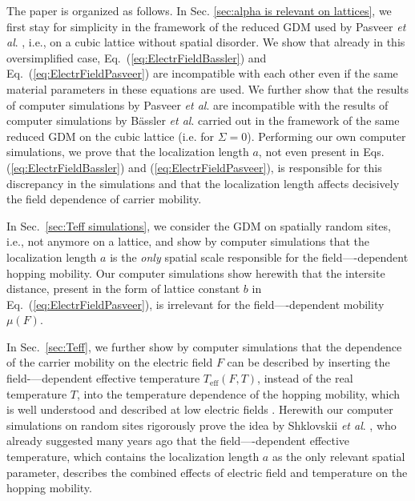 \documentclass[aps,reprint,amsmath,amssymb,superscriptaddress,showpacs,prb]{revtex4-1}
\begin{document}
The paper is organized as follows. In Sec. \ref{sec:alpha is relevant on lattices}, we first stay for simplicity in the framework of the reduced GDM used by Pasveer \textit{et al}. \cite{Pasveer2005}, i.e., on a cubic lattice without spatial disorder. We show that already in this oversimplified case, Eq.~(\ref{eq:ElectrFieldBassler}) and Eq.~(\ref{eq:ElectrFieldPasveer}) are incompatible with each other even if the same material parameters in these equations are used. We further show that the results of computer simulations by Pasveer \textit{et al}. \cite{Pasveer2005} are incompatible with the results of computer simulations by B\"{a}ssler \textit{et al}. \cite{Borsenberger1991,Bassler1993,Anna_Heinz_2015}  carried out in the framework of the same reduced GDM on the cubic lattice (i.e. for $\Sigma=0$). Performing our own computer simulations, we prove that the localization length $a$, not even present in Eqs. (\ref{eq:ElectrFieldBassler}) and (\ref{eq:ElectrFieldPasveer}), is responsible for this discrepancy in the simulations and that the localization length affects decisively the field dependence of carrier mobility.

In Sec.~\ref{sec:Teff simulations}, we consider the GDM on spatially random sites, i.e., not anymore on a lattice, and show by computer simulations that the localization length $a$ is the \textit{only} spatial scale responsible for the field—-dependent hopping mobility. Our computer simulations show herewith that the intersite distance, present in the form of lattice constant $b$ in Eq.~(\ref{eq:ElectrFieldPasveer}), is irrelevant for the field—-dependent mobility  $\mu(F)$.

In Sec.~\ref{sec:Teff}, we further show by computer simulations that the dependence of the carrier mobility on the electric field $F$ can be described by inserting the field-—dependent effective temperature $T_{\text{eff}}(F,T)$, instead of the real temperature $T$, into the temperature dependence of the hopping mobility, which is well understood and described at low electric fields \cite{Baranovski2006,Baranovskii2014,Nenashev_Topical_2015}.  Herewith our computer simulations on random sites rigorously prove the idea by Shklovskii \textit{et al}. \cite{Shklovskii1973,Shklovskii1990Fritzsche,Marianer1992,Hess1993,Cleve1995,Jansson2008PRB}, who already suggested many years ago that the field—-dependent effective temperature, which contains the localization length $a$ as the only relevant spatial parameter, describes the combined effects of electric field and temperature on the hopping mobility.
\end{document}
